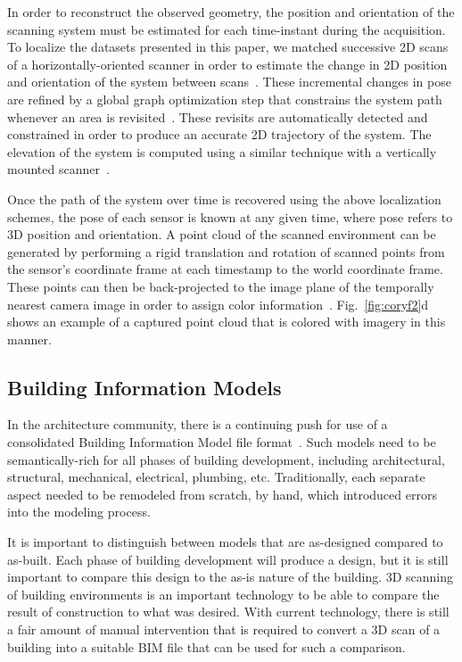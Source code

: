 \documentclass[journal]{IEEEtran}
\begin{document}
In order to reconstruct the observed geometry, the position and orientation of the scanning system must be estimated for each time-instant during the acquisition.  To localize the datasets presented in this paper, we matched successive 2D scans of a horizontally-oriented scanner in order to estimate the change in 2D position and orientation of the system between scans~\cite{NickJournal}.  These incremental changes in pose are refined by a global graph optimization step that constrains the system path whenever an area is revisited~\cite{toro07}.  These revisits are automatically detected and constrained in order to produce an accurate 2D trajectory of the system.  The elevation of the system is computed using a similar technique with a vertically mounted scanner~\cite{Backpack}.

Once the path of the system over time is recovered using the above localization schemes, the pose of each sensor is known at any given time, where pose refers to 3D position and orientation.  A point cloud of the scanned environment can be generated by performing a rigid translation and rotation of scanned points from the sensor's coordinate frame at each timestamp to the world coordinate frame.  These points can then be back-projected to the image plane of the temporally nearest camera image in order to assign color information~\cite{Backpack}.  Fig.~\ref{fig:coryf2}d shows an example of a captured point cloud that is colored with imagery in this manner.

\subsection{Building Information Models}
\label{ssec:BIM}

In the architecture community, there is a continuing push for use of a consolidated Building Information Model file format~\cite{AutodeskBIM}.  Such models need to be semantically-rich for all phases of building development, including architectural, structural, mechanical, electrical, plumbing, etc.  Traditionally, each separate aspect needed to be remodeled from scratch, by hand, which introduced errors into the modeling process.

It is important to distinguish between models that are as-designed compared to as-built.  Each phase of building development will produce a design, but it is still important to compare this design to the as-is nature of the building.  3D scanning of building environments is an important technology to be able to compare the result of construction to what was desired.  With current technology, there is still a fair amount of manual intervention that is  required to convert a 3D scan of a building into a suitable BIM file that can be used for such a comparison.
\end{document}

